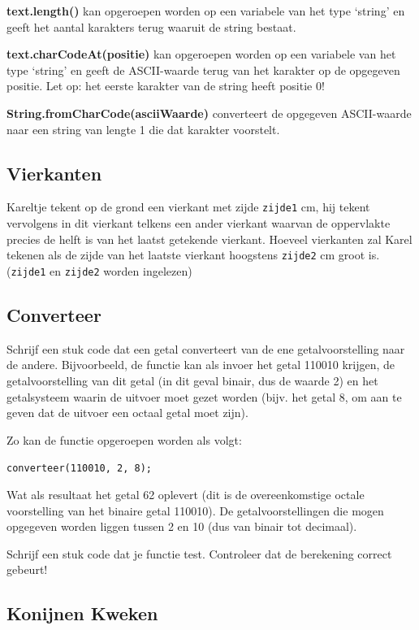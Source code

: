 \textbf{text.length()} kan opgeroepen worden op een variabele van het type `string' en geeft het aantal karakters terug waaruit de string bestaat.

\textbf{text.charCodeAt(positie)} kan opgeroepen worden op een variabele van het type `string' en geeft de ASCII-waarde terug van het karakter op de opgegeven positie. Let op: het eerste karakter van de string heeft positie 0!

\textbf{String.fromCharCode(asciiWaarde)} converteert de opgegeven ASCII-waarde naar een string van lengte 1 die dat karakter voorstelt.

\subsection{Vierkanten}

Kareltje tekent op de grond een vierkant met zijde \texttt{zijde1} cm, hij tekent vervolgens in dit vierkant telkens een ander vierkant waarvan de oppervlakte precies de helft is van het laatst getekende vierkant. Hoeveel vierkanten zal Karel tekenen als de zijde van het laatste vierkant hoogstens \texttt{zijde2} cm groot is. (\texttt{zijde1} en \texttt{zijde2} worden ingelezen)

\subsection{Converteer}

Schrijf een stuk code dat een getal converteert van de ene getalvoorstelling naar de andere. Bijvoorbeeld, de functie kan als invoer het getal 110010 krijgen, de getalvoorstelling van dit getal (in dit geval binair, dus de waarde 2) en het getalsysteem waarin de uitvoer moet gezet worden (bijv. het getal 8, om aan te geven dat de uitvoer een octaal getal moet zijn).

Zo kan de functie opgeroepen worden als volgt:
\begin{center}
\texttt{converteer(110010, 2, 8);}
\end{center}
Wat als resultaat het getal 62 oplevert (dit is de overeenkomstige octale voorstelling van het binaire getal 110010). De getalvoorstellingen die mogen opgegeven worden liggen tussen 2 en 10 (dus van binair tot decimaal).

Schrijf een stuk code dat je functie test. Controleer dat de berekening correct gebeurt!

\subsection{Konijnen Kweken}

